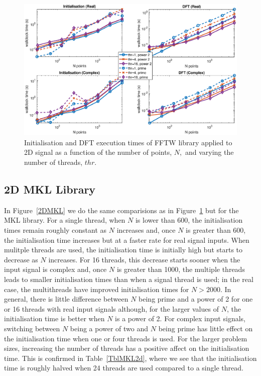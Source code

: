 \documentclass[a4paper]{article}
\begin{document}
\begin{figure}[htb]
    \centering
    \includegraphics[width=0.9\linewidth]{../results/fftw_2d_thr.eps}
  \caption{Initialisation and DFT execution times of FFTW library applied to 2D signal as a function of the
    number of points, $N,$ and varying the number of threads, $thr.$ }
  \label{2DFFTW}
\end{figure}



\subsection{2D MKL Library}\label{Sec:2DMKL}

In Figure~\ref{2DMKL} we do the same comparisions as in
Figure~\ref{2DFFTW} but for the MKL library. For a single thread, when
$N$ is lower than 600, the initialisation times remain roughly
constant as $N$ increases and, once $N$ is greater than 600, the
initialisation time increases but at a faster rate for real signal
inputs. When mulitple threads are used, the initialisation time is
initially high but starts to decrease as $N$ increases. For 16
threads, this decrease starts sooner when the input signal is complex
and, once $N$ is greater than 1000, the multiple threads leads to
smaller initialisation times than when a signal thread is used; in the
real case, the multithreads have improved initialisation times for
$N>2000.$ In general, there is little difference between $N$ being
prime and a power of 2 for one or 16 threads with real input signals
although, for the larger values of $N$, the initialisation time is
better when $N$ is a power of 2. For complex input signals, switching
between $N$ being a power of two and $N$ being prime has little effect
on the initialisation time when one or four threads is used. For the
larger problem sizes, increasing the number of threads has a positive
affect on the initialisation time.  This is confirmed in
Table~\ref{TblMKL2d}, where we see that the initialisation time is
roughly halved when 24 threads are used compared to a single thread.
\end{document}
